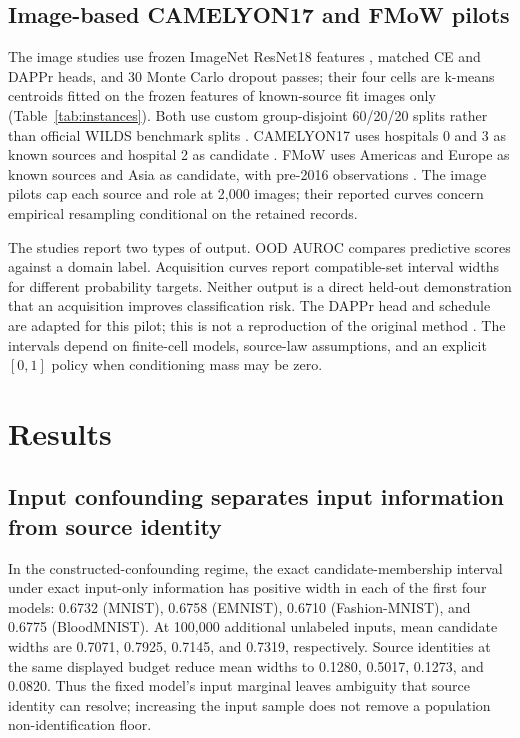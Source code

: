 \documentclass[11pt]{article}
\begin{document}
\subsection{Image-based CAMELYON17 and FMoW pilots}
\label{sec:pilots}

The image studies use frozen ImageNet ResNet18 features \citep{he2016}, matched CE and DAPPr heads, and 30 Monte Carlo dropout passes; their four cells are k-means centroids fitted on the frozen features of known-source fit images only (Table~\ref{tab:instances}). Both use custom group-disjoint 60/20/20 splits rather than official WILDS benchmark splits \citep{koh2021}. CAMELYON17 uses hospitals 0 and 3 as known sources and hospital 2 as candidate \citep{bandi2018}. FMoW uses Americas and Europe as known sources and Asia as candidate, with pre-2016 observations \citep{christie2018}. The image pilots cap each source and role at 2,000 images; their reported curves concern empirical resampling conditional on the retained records.

The studies report two types of output. OOD AUROC compares predictive scores against a domain label. Acquisition curves report compatible-set interval widths for different probability targets. Neither output is a direct held-out demonstration that an acquisition improves classification risk. The DAPPr head and schedule are adapted for this pilot; this is not a reproduction of the original method \citep{dappr2026}. The intervals depend on finite-cell models, source-law assumptions, and an explicit $[0,1]$ policy when conditioning mass may be zero.

\section{Results}
\label{sec:results}

\subsection{Input confounding separates input information from source identity}

In the constructed-confounding regime, the exact candidate-membership interval under exact input-only information has positive width in each of the first four models: 0.6732 (MNIST), 0.6758 (EMNIST), 0.6710 (Fashion-MNIST), and 0.6775 (BloodMNIST). At 100,000 additional unlabeled inputs, mean candidate widths are 0.7071, 0.7925, 0.7145, and 0.7319, respectively. Source identities at the same displayed budget reduce mean widths to 0.1280, 0.5017, 0.1273, and 0.0820. Thus the fixed model's input marginal leaves ambiguity that source identity can resolve; increasing the input sample does not remove a population non-identification floor.
\end{document}
